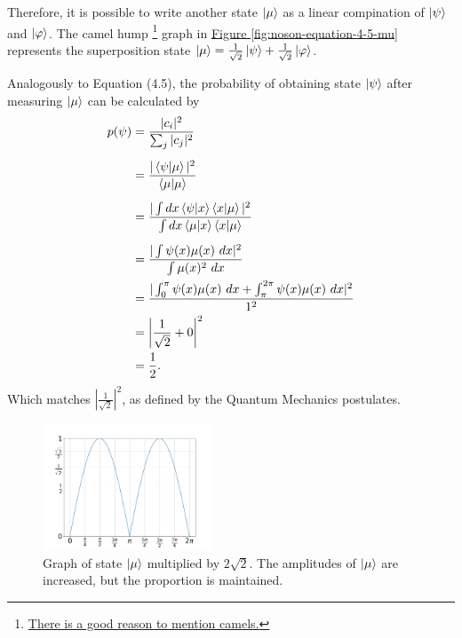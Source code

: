 Therefore, it is possible to write another state $\ket \mu$ as
a linear compination of $\ket \psi$ and $\ket \varphi$.
The camel hump
\footnote{\href{https://twitter.com/GustavowlKoruja/status/1100581409008336897}{
    There is a good reason to mention camels.}
}
graph in
\hyperref[fig:noson-equation-4-5-psi]{Figure \ref{fig:noson-equation-4-5-mu}}
represents the superposition state
$\ket\mu = \frac{1}{\sqrt2} \ket\psi + \frac{1}{\sqrt2} \ket\varphi$.

Analogously to Equation (4.5),
the probability of obtaining state $\ket{\psi}$ after measuring
$\ket \mu$ can be calculated by
\begin{align}
    p(\psi) &= \frac{|c_i|^2}{\sum_j |c_j|^2} \\[5pt]
    &= \frac{|\mathop{\mathinner{ \langle{\psi}|{\mu}\rangle}}|^2}{\mathop{\mathinner{ \langle{\mu}|{\mu}\rangle}}} \\[5pt]
    &= \frac{|\int dx \mathop{\mathinner{ \langle{\psi}|{x}\rangle}} \mathop{\mathinner{ \langle{x}|{\mu}\rangle}}|^2}{\int dx \mathop{\mathinner{ \langle{\mu}|{x}\rangle}} \mathop{\mathinner{ \langle{x}|{\mu}\rangle}}} \\[5pt]
    &= \frac{|\int \psi(x) \mu(x)\ dx|^2}{\int \mu(x)^2\ dx} \\
    &= \frac{|\int_0^\pi \psi(x) \mu(x)\ dx + \int_\pi^{2\pi} \psi(x) \mu(x)\ dx|^2}{1^2} \\
    &= \left| \frac{1}{\sqrt2} + 0 \right|^2 \\
    &= \frac 1 2.
\end{align}
Which matches $|\frac{1}{\sqrt2}|^2$,
as defined by the Quantum Mechanics postulates.

\begin{figure}[htb]
    \centering
    \includegraphics[width=0.45\textwidth]{img/noson/chapter04/section4_1/2-sqrt2-mu.png}
    \captionsetup{width=0.9\textwidth}
    \caption{Graph of state $\ket \mu$ multiplied  by $2 \sqrt2$.
        The amplitudes of $\ket \mu$ are increased,
        but the proportion is maintained.}
    \label{fig:noson-equation-4-5-2-sqrt2-mu}
\end{figure}

